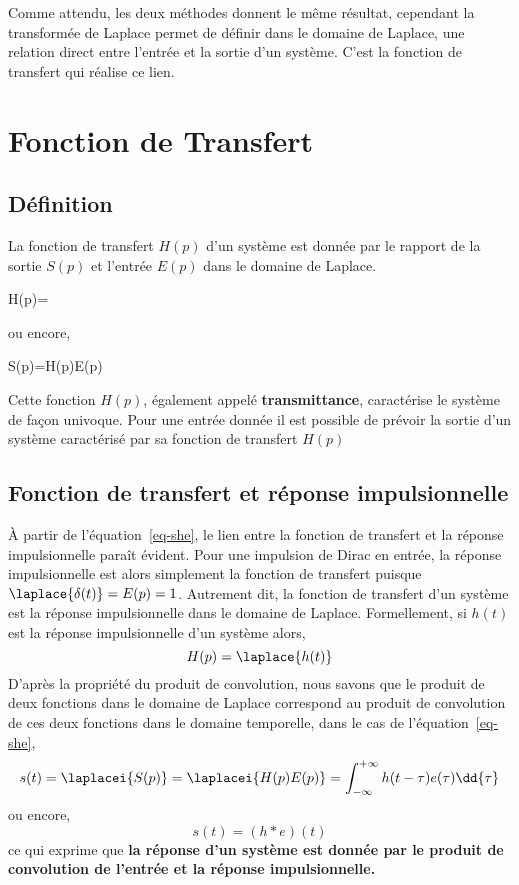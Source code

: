 Comme attendu, les deux méthodes donnent le même résultat, cependant la transformée de Laplace permet de définir dans 
le domaine de Laplace, une relation direct entre l'entrée et la sortie d'un système. C'est la fonction de transfert 
qui réalise ce lien.

\section{Fonction de Transfert}

\subsection{Définition}

La fonction de transfert $H(p)$ d'un système est donnée par le rapport de la 
sortie $S(p)$ et l'entrée $E(p)$ dans le domaine de Laplace. 
\begin{bequation}
H(p)=
\end{bequation}
ou encore,
\begin{bequation}
    S(p)=H(p)E(p)\label{eq-she}
\end{bequation}

Cette fonction $H(p)$, également appelé \textbf{transmittance}, caractérise le système de façon univoque.
Pour une entrée donnée il est possible de prévoir la sortie d'un système caractérisé par 
sa fonction de transfert $H(p)$

\subsection{Fonction de transfert et réponse impulsionnelle}
À partir de l'équation~\ref{eq-she}, le lien entre la fonction de transfert
et la réponse impulsionnelle paraît évident. Pour une impulsion de Dirac 
en entrée, la réponse impulsionnelle est alors simplement la fonction 
de transfert puisque $\laplace{\delta(t)}=E(p)=1$. Autrement dit, la fonction de 
transfert d'un système est la réponse impulsionnelle dans le domaine de Laplace.
Formellement, si $h(t)$ est la réponse impulsionnelle d'un système alors,
$$
H(p) = \laplace{h(t)}
$$
D'après la propriété du produit de convolution, nous savons que le produit de deux fonctions
dans le domaine de Laplace correspond au produit de convolution de ces deux fonctions
dans le domaine temporelle, dans le cas de l'équation~\ref{eq-she},
$$
s(t)=\laplacei{S(p)}=\laplacei{H(p)E(p)}=\int_{-\infty}^{+\infty}h(t-\tau)e(\tau)\dd{\tau}
$$
ou encore,
$$
s(t)=(h*e)(t)
$$
ce qui exprime que \textbf{la réponse d'un système est donnée par le produit de convolution de l'entrée  et la réponse impulsionnelle.}

